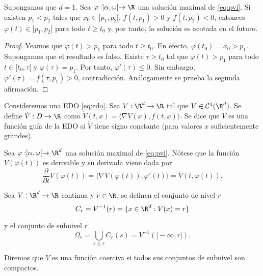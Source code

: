 \documentclass{article}
\begin{document}
\begin{proposition}
  Supongamos que $d = 1$. Sea $\varphi: ]\alpha, \omega[ \to \R$ una solución maximal de
  \eqref{eq:pvi}. Si existen $p_1 < p_2$ tales que $x_0 \in ]p_1, p_2[$, $f(t, p_1) > 0$ y
  $f(t, p_2) < 0$, entonces $\varphi(t) \in ]p_1, p_2[$ para todo $t \ge t_0$ y, por tanto, la
  solución es acotada en el futuro.
\end{proposition}
\begin{proof}
  Veamos que $\varphi(t) > p_1$ para todo $t \ge t_0$. En efecto, $\varphi(t_0) = x_0 >
  p_1$. Supongamos que el resultado es falso. Existe $\tau > t_0$ tal que $\varphi(t) > p_1$ para
  todo $t \in [t_0, \tau[$ y $\varphi(\tau) = p_1$. Por tanto, $\varphi'(\tau) \le 0$. Sin embargo,
  $\varphi'(\tau) = f(\tau, p_1) > 0$, contradicción. Análogamente se prueba la segunda afirmación.
\end{proof}

\begin{definition}
  Consideremos una EDO \eqref{eq:edo}.  Sea $V : \R^d \to \R$ tal que $V \in
  \mathcal{C}^1(\R^d)$. Se define $\dot{V}: D \to \R$ como
  $\dot{V}(t,x) = \langle \nabla V(x), f(t,x)\rangle$.  Se dice que $V$ es una función guía de la
  EDO si $\dot{V}$ tiene signo constante (para valores $x$ suficientemente grandes).
\end{definition}

Sea $\varphi: ]\alpha, \omega[ \to \R^d$ una solución maximal de \eqref{eq:pvi}. Nótese que la
función $V(\varphi(t))$ es derivable y su derivada viene dada por
\[ \frac{\partial}{\partial t} V(\varphi(t)) = \langle \nabla V(\varphi(t)), \varphi'(t)\rangle =
  \dot{V}(t, \varphi(t)). \]


\begin{definition}
  Sea $V: \R^d \to \R$ continua y $r \in \R$, se definen el conjunto de nivel $r$
  \[C_r = V^{-1}(r) = \{x \in \R^d: V(x) = r\}\]

  y el conjunto de subnivel $r$
  \[\Omega_r = \bigcup_{s \le r} C_r(s) = V^{-1}(]-\infty,r]).\]

  Diremos que $V$ es una función coerciva si todos sus conjuntos de subnivel son compactos.
\end{definition}
\end{document}
